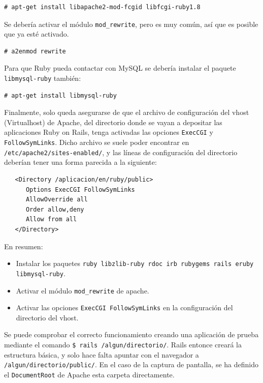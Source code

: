 \begin{verbatim}
# apt-get install libapache2-mod-fcgid libfcgi-ruby1.8
\end{verbatim}

Se debería activar el módulo \texttt{mod\_rewrite}, pero es muy común, así que es posible que ya esté activado.
\begin{verbatim}
# a2enmod rewrite
\end{verbatim}

Para que Ruby pueda contactar con MySQL se debería instalar el paquete \texttt{libmysql-ruby} también:
\begin{verbatim}
# apt-get install libmysql-ruby
\end{verbatim}

Finalmente, solo queda asegurarse de que el archivo de configuración del vhost (Virtualhost) de Apache, del directorio donde se vayan a depositar las aplicaciones Ruby on Rails, tenga activadas las opciones \texttt{ExecCGI} y \texttt{FollowSymLinks}. Dicho archivo se suele poder encontrar en \texttt{/etc/apache2/sites-enabled/}, y las líneas de configuración del directorio deberían tener una forma parecida a la siguiente:

\begin{verbatim}
   <Directory /aplicacion/en/ruby/public>
      Options ExecCGI FollowSymLinks
      AllowOverride all
      Order allow,deny
      Allow from all
   </Directory>
\end{verbatim}

En resumen:
\begin{itemize}
	\item Instalar los paquetes  \texttt{ruby libzlib-ruby rdoc irb rubygems rails eruby libmysql-ruby}.
	\item Activar el módulo \texttt{mod\_rewrite} de apache.
	\item Activar las opciones \texttt{ExecCGI FollowSymLinks} en la configuración del directorio del vhost.
\end{itemize}

Se puede comprobar el correcto funcionamiento creando una aplicación de prueba mediante el comando \texttt{\$ rails /algun/directorio/}. Rails entonce creará la estructura básica, y solo hace falta apuntar con el navegador a \texttt{/algun/directorio/public/}. En el caso de la captura de pantalla, se ha definido el \texttt{DocumentRoot} de Apache esta carpeta directamente.

